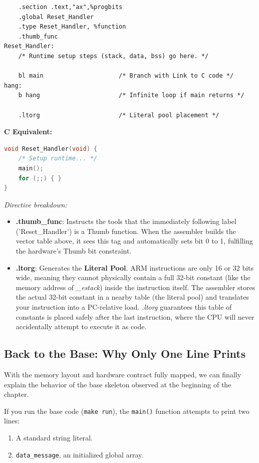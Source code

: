 \begin{lstlisting}
    .section .text,"ax",%progbits
    .global Reset_Handler
    .type Reset_Handler, %function
    .thumb_func
Reset_Handler:
    /* Runtime setup steps (stack, data, bss) go here. */

    bl main                     /* Branch with Link to C code */
hang:
    b hang                      /* Infinite loop if main returns */

    .ltorg                      /* Literal pool placement */
\end{lstlisting}

\textbf{C Equivalent:}
\begin{lstlisting}[language=c]
void Reset_Handler(void) {
    /* Setup runtime... */
    main();
    for (;;) { }
}
\end{lstlisting}

\textit{Directive breakdown:} 
\begin{itemize}
    \item \textbf{.thumb\_func}: Instructs the tools that the immediately following label ('Reset\_Handler') is a Thumb function. When the assembler builds the vector table above, it sees this tag and automatically sets bit 0 to 1, fulfilling the hardware's Thumb bit constraint.
    \item \textbf{.ltorg}: Generates the \textbf{Literal Pool}. ARM instructions are only 16 or 32 bits wide, meaning they cannot physically contain a full 32-bit constant (like the memory address of \textit{\_estack}) inside the instruction itself. The assembler stores the actual 32-bit constant in a nearby table (the literal pool) and translates your instruction into a PC-relative load. \textit{.ltorg} guarantees this table of constants is placed safely after the last instruction, where the CPU will never accidentally attempt to execute it as code.
\end{itemize}

\subsection{Back to the Base: Why Only One Line Prints}
With the memory layout and hardware contract fully mapped, we can finally explain the behavior of the base skeleton observed at the beginning of the chapter.

If you run the base code (\texttt{make run}), the \texttt{main()} function attempts to print two lines:
\begin{enumerate}
    \item A standard string literal.
    \item \texttt{data\_message}, an initialized global array.
\end{enumerate}

